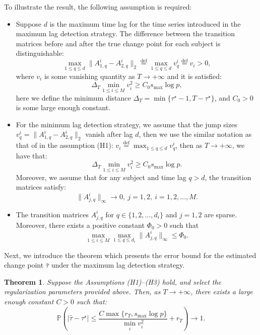 \documentclass[11pt]{article}
\newtheorem{theorem}{Theorem}
\begin{document}
To illustrate the result, the following assumption is required:
\begin{itemize}
    \item[(H1)] Suppose $d$ is the maximum time lag for the time series introduced in the maximum lag detection strategy. The difference between the transition matrices before and after the true change point for each subject is distinguishable:
    \begin{equation*}
        \max_{1\leq q \leq d}\|A_{1,q}^i - A_{2,q}^i\|_2 \overset{\text{def}}{=} \max_{1\leq q \leq d}v_q^i \overset{\text{def}}{=} v_i > 0,
    \end{equation*}
    where $v_i$ is some vanishing quantity as $T \to +\infty$ and it is satisfied:
    \begin{equation*}
        \Delta_T \min_{1\leq i \leq M}v_i^2 \geq C_0 s_{\max}\log p,
    \end{equation*}
    here we define the minimum distance $\Delta_T = \min\{\tau^\star - 1, T - \tau^\star\}$, and $C_0>0$ is some large enough constant.
    
    \item[(H2)] For the minimum lag detection strategy, we assume that the jump sizes $v_q^i = \|A_{1,q}^i - A_{2,q}^i\|_2$ vanish after lag $d$, then we use the similar notation as that of in the assumption (H1): $v_i \overset{\text{def}}{=} \max_{1\leq q \leq d} v_q^i$, then as $T \to +\infty$, we have that:
    \begin{equation*}
        \Delta_T\min_{1\leq i \leq M}v_i^2 \geq C_0 s_{\max}\log p.
    \end{equation*}
    Moreover, we assume that for any subject and time lag $q > d$, the transition matrices satisfy:
    \begin{equation*}
        \|A_{j,q}^i\|_\infty \to 0,\ j=1,2,\ i=1,2,\dots, M.
    \end{equation*}
    
    \item[(H3)] The transition matrices $A_{j,q}^i$ for $q \in \{1,2,\dots, d_i\}$ and $j=1,2$ are sparse. Moreover, there exists a positive constant $\Phi_0 > 0$ such that
    \begin{equation*}
        \max_{1\leq i \leq M}\max_{1\leq q \leq d_i}\|A_{j,q}^i\|_\infty \leq \Phi_0.
    \end{equation*}
\end{itemize}

Next, we introduce the theorem which presents the error bound for the estimated change point $\widehat{\tau}$ under the maximum lag detection strategy. 
\begin{theorem}
\label{thm:1}
Suppose the Assumptions (H1)--(H3) hold, and select the regularization parameters provided above. Then, as $T\to +\infty$, there exists a large enough constant $C>0$ such that:
\begin{equation*}
    \mathbb{P}\left( |\widehat{\tau} - \tau^\star| \leq \frac{C\max\{r_T, s_{\max}\log p\}}{\min_i v_i^2} + r_T \right) \to 1.
\end{equation*}
\end{theorem}
\end{document}
